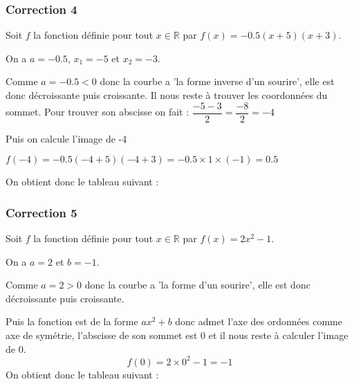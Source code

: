 \documentclass[15pt, mathserif]{beamer}
\newcommand{\R}{\mathbb{R}}			%
\begin{document}
\begin{frame}
\vspace{-10mm}
	\frametitle{Correction 4}
 \vspace*{1cm} Soit $f$ la fonction définie pour tout $x \in \R$ par $f(x)=-0.5(x+5)(x+3)$. 
 
 On a $a= -0.5$, $x_1= -5$ et $x_2= -3$. 
 
Comme $a=-0.5<0$ donc la courbe a 'la forme inverse d'un sourire', elle est donc décroissante puis croissante. Il nous reste à trouver les coordonnées du sommet. Pour trouver son abscisse on fait : $\dfrac{-5-3}{2}=\dfrac{-8}{2}=-4$ 
 
 Puis on calcule l'image de -4 
 
 $f(-4)=-0.5(-4+5)(-4+3)=-0.5\times1\times\left(-1\right)=0.5$ 
 
 On obtient donc le tableau suivant : 
 \begin{center} 
 \end{center} 
\end{frame}


\begin{frame}
\vspace{-10mm}
	\frametitle{Correction 5}
\vspace*{1cm} 
 Soit $f$ la fonction définie pour tout $x \in \R$ par $f(x)=2x^2 -1$. 
 
 On a $a= 2$ et $b= -1$. 
 
 Comme $a=2>0$ donc la courbe a 'la forme d'un sourire', elle est donc décroissante puis croissante. 
 
 Puis la fonction est de la forme $ax^2+b$ donc admet l'axe des ordonnées comme axe de symétrie, l'abscisse de son sommet est 0 et il nous reste à calculer l'image de 0. $$f(0)= 2\times 0^2-1=-1$$ On obtient donc le tableau suivant : 
 \begin{center} 
 \end{center} 
 \end{frame}
\end{document}
